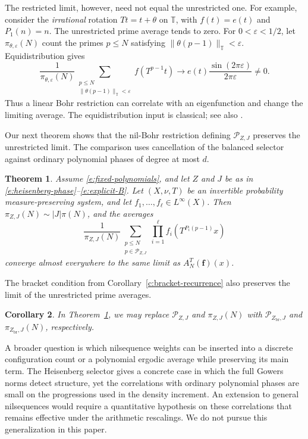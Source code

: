 \documentclass[12pt]{amsart}
\newcommand{\1}{\mathbf 1}
\newtheorem{theorem}{Theorem}[section]
\newtheorem{corollary}[theorem]{Corollary}
\theoremstyle{definition}
\begin{document}
The restricted limit, however, need not equal the unrestricted one.
For example, consider the \emph{irrational} rotation $Tt=t+\theta$ on
$\mathbb T$, with $f(t)=e(t)$ and $P_1(n)=n$. The unrestricted prime
average tends to zero. For $0<\varepsilon<1/2$, let
$\pi_{\theta,\varepsilon}(N)$ count the primes $p\leq N$ satisfying
$\|\theta(p-1)\|_{\mathbb T}<\varepsilon$. Equidistribution gives
\[
 \frac1{\pi_{\theta,\varepsilon}(N)}
 \sum_{\substack{p\leq N\\
       \|\theta(p-1)\|_{\mathbb T}<\varepsilon}}
       f(T^{p-1}t)
 \longrightarrow
 e(t)\frac{\sin(2\pi\varepsilon)}{2\pi\varepsilon}\ne0.
\]
Thus a linear Bohr restriction can correlate with an eigenfunction
and change the limiting average. The equidistribution input is
classical; see also \cite{ShaoTeravainen}.

Our next theorem shows that the nil-Bohr restriction defining
$\mathcal P_{Z,J}$ preserves the unrestricted limit. The comparison
uses cancellation of the balanced selector against ordinary polynomial
phases of degree at most $d$.

\begin{theorem}\label{t:pointwise}
 Assume \eqref{e:fixed-polynomials}, and let $Z$ and $J$ be as in
 \eqref{e:heisenberg-phase}--\eqref{e:explicit-B}.
 Let $(X,\nu,T)$ be an invertible probability measure-preserving
 system, and let $f_1,\ldots,f_\ell\in L^\infty(X)$. Then
 $\pi_{Z,J}(N)\sim |J|\pi(N)$, and the averages
 \[
  \frac1{\pi_{Z,J}(N)}
   \sum_{\substack{p\leq N\\p\in\mathcal P_{Z,J}}}
        \prod_{i=1}^{\ell}f_i(T^{P_i(p-1)}x)
 \]
 converge almost everywhere to the same limit as
 $A_N^T(\mathbf f)(x)$.
\end{theorem}
The bracket condition from Corollary~\ref{c:bracket-recurrence}
also preserves the limit of the unrestricted prime averages.
\begin{corollary}\label{c:bracket-pointwise}
In Theorem~\ref{t:pointwise}, we may replace $\mathcal P_{Z,J}$
and $\pi_{Z,J}(N)$ with $\mathcal P_{Z_{\mathrm{br}},J}$
and $\pi_{Z_{\mathrm{br}},J}(N)$, respectively.
\end{corollary}





\bigskip

A broader question is which nilsequence weights can be inserted into
a discrete configuration count or a polynomial ergodic average while
preserving its main term. The Heisenberg selector gives a concrete
case in which the full Gowers norms detect structure, yet the
correlations with ordinary polynomial phases are small on the
progressions used in the density increment. An extension to general
nilsequences would require a quantitative hypothesis on these
correlations that remains effective under the arithmetic rescalings. We do not pursue this generalization in this paper. 
\end{document}
